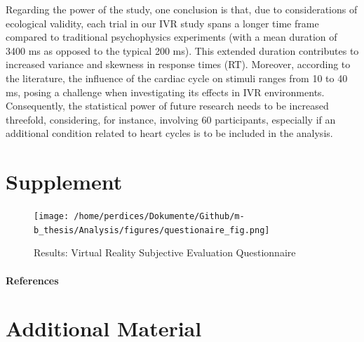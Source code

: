 \documentclass[12pt,oneside,openright]{report}
\begin{document}
Regarding the power of the study, one conclusion is that, due to considerations of ecological validity, each trial in our IVR study spans a longer time frame compared to traditional psychophysics experiments (with a mean duration of 3400 ms as opposed to the typical 200 ms). This extended duration contributes to increased variance and skewness in response times (RT). Moreover, according to the literature, the influence of the cardiac cycle on stimuli ranges from 10 to 40 ms, posing a challenge when investigating its effects in IVR environments. Consequently, the statistical power of future research needs to be increased threefold, considering, for instance, involving 60 participants, especially if an additional condition related to heart cycles is to be included in the analysis.


\newpage
\section*{Supplement}
    \begin{figure}[H]
        \centering
        \texttt{[image: /home/perdices/Dokumente/Github/m-b\_thesis/Analysis/figures/questionaire\_fig.png]}
        \caption{Results: Virtual Reality Subjective Evaluation Questionnaire}
        \label{fig:quest}
    \end{figure}
\pagebreak



\paragraph{\textbf{References}}
\printbibliography[heading=none]


\pagebreak
\vspace*{\fill}
\section*{\centering Additional Material}
\vspace*{\fill}
\end{document}
